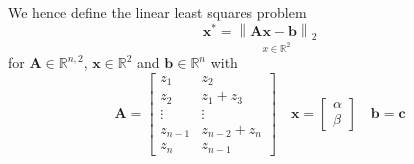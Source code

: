\documentclass{article}
\begin{document}
We hence define the linear least squares problem 
\begin{equation*}
    \mathbf{x}^{*} = \underset{x\in\mathbb{R}^{2}}{\left\lVert \mathbf{A}\mathbf{x} - \mathbf{b}\right\rVert_{2}}
\end{equation*}
for $\mathbf{A} \in \mathbb{R}^{n,2}$, $\mathbf{x}\in \mathbb{R}^{2}$ and $\mathbf{b}\in \mathbb{R}^{n}$ with
\begin{equation*}
    \mathbf{A} = \begin{bmatrix}
        z_{1} & z_{2} \\
         z_{2} & z_{1} +z_{3} \\
         \vdots & \vdots \\
         z_{n-1} & z_{n-2} + z_{n} \\
         z_{n} & z_{n-1}
    \end{bmatrix} \quad
    \mathbf{x} = \begin{bmatrix}
        \alpha \\
        \beta
    \end{bmatrix}
    \quad 
    \mathbf{b} = \mathbf{c}
\end{equation*}

\pagebreak
\end{document}
